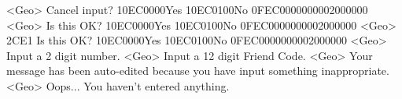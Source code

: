 <Geo> Cancel input? {10}{EC}{00}{00}Yes {10}{EC}{01}{00}No {0F}{EC}{00}{00}{00}{00}{02}{00}{00}{00}
<Geo> Is this OK? {10}{EC}{00}{00}Yes {10}{EC}{01}{00}No {0F}{EC}{00}{00}{00}{00}{02}{00}{00}{00}
<Geo> {2C}{E1} Is this OK? {10}{EC}{00}{00}Yes {10}{EC}{01}{00}No {0F}{EC}{00}{00}{00}{00}{02}{00}{00}{00}
<Geo> Input a 2 digit number. 
<Geo> Input a 12 digit Friend Code. 
<Geo> Your message has been auto-edited because you have input something inappropriate. 
<Geo> Oops... You haven't entered anything. 
